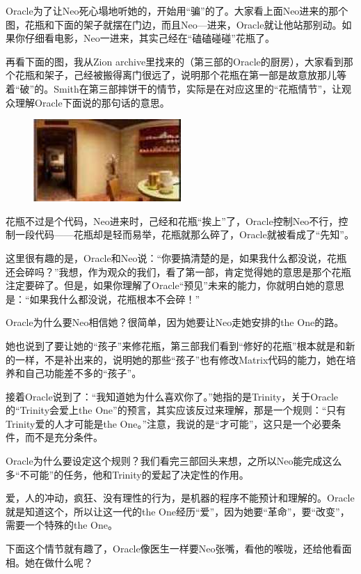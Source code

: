 \documentclass[UTF8]{ctexart}
\begin{document}
Oracle为了让Neo死心塌地听她的，开始用“骗”的了。大家看上面Neo进来的那个图，花瓶和下面的架子就摆在门边，而且Neo—进来，Oracle就让他站那别动。如果你仔细看电影，Neo一进来，其实己经在“磕磕碰碰”花瓶了。

再看下面的图，我从Zion archive里找来的（第三部的Oracle的厨房），大家看到那个花瓶和架子，己经被搬得离门很远了，说明那个花瓶在第一部是故意放那儿等着“破”的。Smith在第三部摔饼干的情节，实际是在对应这里的“花瓶情节”，让观众理解Oracle下面说的那句话的意思。

\begin{figure}[htb]
\centering
\includegraphics[width=0.5\linewidth]{fig/read_Matrix-48}
\end{figure}

花瓶不过是个代码，Neo进来时，己经和花瓶“挨上”了，Oracle控制Neo不行，控制一段代码——花瓶却是轻而易举，花瓶就那么碎了，Oracle就被看成了“先知”。

这里很有趣的是，Oracle和Neo说：“你要搞清楚的是，如果我什么都没说，花瓶还会碎吗？”我想，作为观众的我们，看了第一部，肯定觉得她的意思是那个花瓶注定要碎了。但是，如果你理解了Oracle“预见”未来的能力，你就明白她的意思是：“如果我什么都没说，花瓶根本不会碎！”

Oracle为什么要Neo相信她？很简单，因为她要让Neo走她安排的the One的路。

她也说到了要让她的“孩子”来修花瓶，第三部我们看到“修好的花瓶”根本就是和新的一样，不是补出来的，说明她的那些“孩子”也有修改Matrix代码的能力，她在培养和自己功能差不多的“孩子”。

接着Oracle说到了：“我知道她为什么喜欢你了。”她指的是Trinity，关于Oracle的“Trinity会爱上the One”的预言，其实应该反过来理解，那是一个规则：“只有Trinity爱的人才可能是the One。”注意，我说的是“才可能”，这只是一个必要条件，而不是充分条件。

Oracle为什么要设定这个规则？我们看完三部回头来想，之所以Neo能完成这么多“不可能”的任务，他和Trinity的爱起了决定性的作用。

爱，人的冲动，疯狂、没有理性的行为，是机器的程序不能预计和理解的。Oracle就是知道这个，所以让这一代的the One经历“爱”，因为她要“革命”，要“改变”，需要一个特殊的the One。

下面这个情节就有趣了，Oracle像医生一样要Neo张嘴，看他的喉咙，还给他看面相。她在做什么呢？
\end{document}

